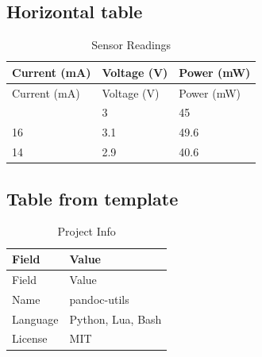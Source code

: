 \documentclass[
]{article}
\begin{document}
\subsection{Horizontal table}\label{horizontal-table}

\protect{}\label{tbl:measurements}
\begin{longtable}[]{@{}lll@{}}
\caption{Sensor Readings}\tabularnewline
\toprule\noalign{}
Current (mA) & Voltage (V) & Power (mW) \\
\midrule\noalign{}
\endfirsthead
\toprule\noalign{}
Current (mA) & Voltage (V) & Power (mW) \\
\midrule\noalign{}
\endhead
\bottomrule\noalign{}
\endlastfoot
15 & 3 & 45 \\
16 & 3.1 & 49.6 \\
14 & 2.9 & 40.6 \\
\end{longtable}

\subsection{Table from template}\label{table-from-template}

\protect{}\label{tbl:project}
\begin{longtable}[]{@{}ll@{}}
\caption{Project Info}\tabularnewline
\toprule\noalign{}
Field & Value \\
\midrule\noalign{}
\endfirsthead
\toprule\noalign{}
Field & Value \\
\midrule\noalign{}
\endhead
\bottomrule\noalign{}
\endlastfoot
Name & pandoc-utils \\
Language & Python, Lua, Bash \\
License & MIT \\
\end{longtable}
\end{document}

